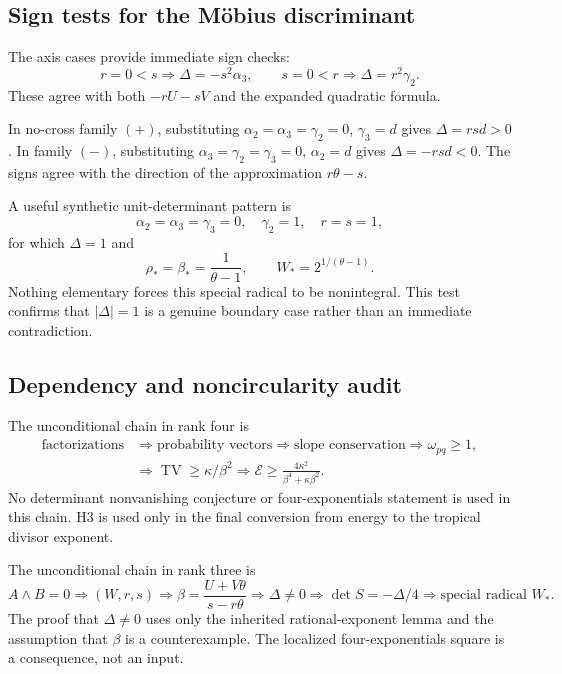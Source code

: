 \documentclass[11pt,oneside]{article}
\theoremstyle{research}
\theoremstyle{definition}
\newcommand{\E}{\mathcal E}
\newcommand{\TV}{\operatorname{TV}}
\begin{document}
\subsection{Sign tests for the M\"obius discriminant}

The axis cases provide immediate sign checks:
\[
 r=0<s \Longrightarrow \Delta=-s^2\alpha_3,
 \qquad
 s=0<r \Longrightarrow \Delta=r^2\gamma_2.
\]
These agree with both $-rU-sV$ and the expanded quadratic formula.

In no-cross family $(+)$, substituting
$\alpha_2=\alpha_3=\gamma_2=0$, $\gamma_3=d$ gives
$\Delta=rsd>0$.  In family $(-)$, substituting
$\alpha_3=\gamma_2=\gamma_3=0$, $\alpha_2=d$ gives
$\Delta=-rsd<0$.  The signs agree with the direction of the approximation
$r\theta-s$.

A useful synthetic unit-determinant pattern is
\[
 \alpha_2=\alpha_3=\gamma_3=0,
 \quad \gamma_2=1,
 \quad r=s=1,
\]
for which $\Delta=1$ and
\[
 \rho_*=\beta_*=\frac1{\theta-1},
 \qquad
 W_*=2^{1/(\theta-1)}.
\]
Nothing elementary forces this special radical to be nonintegral.  This test
confirms that $|\Delta|=1$ is a genuine boundary case rather than an immediate
contradiction.

\subsection{Dependency and noncircularity audit}

The unconditional chain in rank four is
\[
 \begin{aligned}
 \text{factorizations}
 &\Longrightarrow \text{probability vectors}
 \Longrightarrow \text{slope conservation}
 \Longrightarrow \omega_{pq}\ge1,\\
 &\Longrightarrow \TV\ge\kappa/\beta^2
 \Longrightarrow \E\ge
 \frac{4\kappa^2}{\beta^4+\kappa\beta^2}.
 \end{aligned}
\]
No determinant nonvanishing conjecture or four-exponentials statement is used
in this chain.  H3 is used only in the final conversion from energy to the
tropical divisor exponent.

The unconditional chain in rank three is
\[
 A\wedge B=0
 \Longrightarrow (W,r,s)
 \Longrightarrow \beta=\frac{U+V\theta}{s-r\theta}
 \Longrightarrow \Delta\ne0
 \Longrightarrow \det S=-\Delta/4
 \Longrightarrow \text{special radical }W_*.
\]
The proof that $\Delta\ne0$ uses only the inherited rational-exponent lemma and
the assumption that $\beta$ is a counterexample.  The localized
four-exponentials square is a consequence, not an input.
\end{document}
